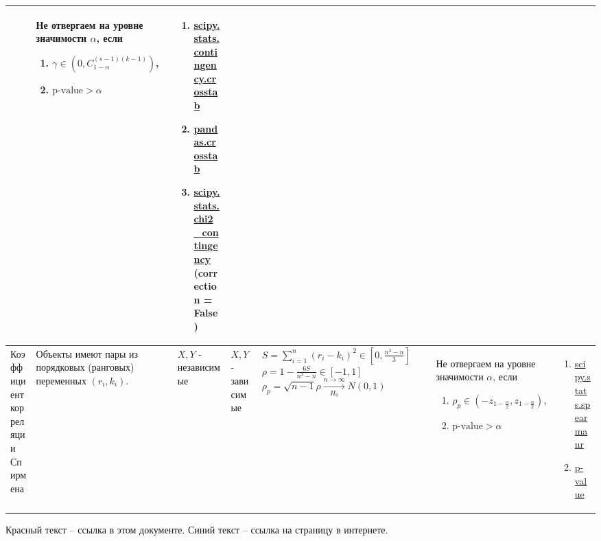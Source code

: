 \documentclass[14pt, a1paper, fleqn]{extarticle}
\begin{document}
\begin{center}
\begin{tabular}{|p{6cm}|p{8cm}|p{3cm}|p{3cm}|p{9cm}|p{10cm}|p{14cm}|}
            & Не отвергаем на уровне значимости \( \alpha \), если 
            \begin{enumerate}
                \item \( \gamma \in (0,  C^{(s-1)(k-1)}_{1-\alpha}) \),
                \item \( \text{p-value} > \alpha \)
            \end{enumerate} 
            & \begin{enumerate}
                \item \href{https://docs.scipy.org/doc/scipy/reference/generated/scipy.stats.contingency.crosstab.html}{scipy.stats.contingency.crosstab}
                \item \href{https://pandas.pydata.org/docs/reference/api/pandas.crosstab.html}{pandas.crosstab}
                \item \href{https://docs.scipy.org/doc/scipy/reference/generated/scipy.stats.chi2_contingency.html}{scipy.stats.chi2\_contingency} (correction = False)
            \end{enumerate} \\
            \hline
            Коэффициент корреляции Спирмена
            & Объекты имеют пары из порядковых (ранговых) переменных \( (r_i, k_i) \).
            & \( X, Y \) - независимые
            & \( X, Y \) - зависимые 
            & \( S = \sum_{i=1}^{n} (r_i - k_i)^2 \in \left[ 0, \frac{n^3 - n}{3} \right]\)
            \newline
            \( \rho = 1 - \frac{6S}{n^3-n} \in [-1, 1] \)
            \newline
            \( \rho_p = \sqrt{n-1} \rho \xrightarrow[H_0]{n \to \infty} N(0, 1) \)
            & Не отвергаем на уровне значимости \( \alpha \), если 
            \begin{enumerate}
                \item \( \rho_p \in \left( -z_{1-\frac{\alpha}{2}}, z_{1-\frac{\alpha}{2}} \right) \),
                \item \( \text{p-value} > \alpha \)
            \end{enumerate} 
            & \begin{enumerate}
                \item \href{https://docs.scipy.org/doc/scipy/reference/generated/scipy.stats.spearmanr.html}{scipy.stats.spearmanr}
                \item \hyperref[pv]{p-value}
            \end{enumerate} \\
            \hline
        \end{tabular}
    \end{center}

    Красный текст -- ссылка в этом документе. Синий текст -- ссылка на страницу в интернете.
\end{document}

